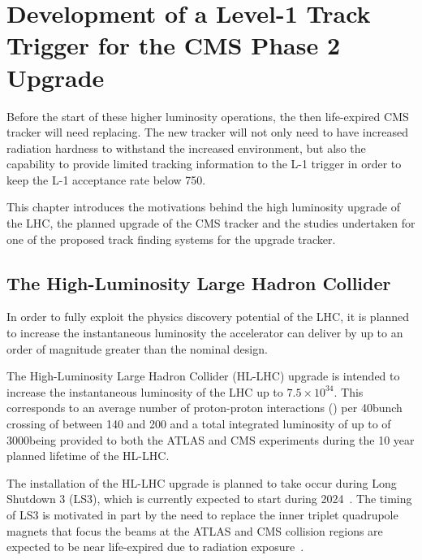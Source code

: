 \chapter{Development of a Level-1 Track Trigger for the CMS Phase 2 Upgrade}\label{chapter:tk-upgrade}
Before the start of these higher luminosity operations, the then life-expired CMS tracker will need replacing.
The new tracker will not only need to have increased radiation hardness to withstand the increased \PU environment, but also the capability to provide limited tracking information to the L-1 trigger in order to keep the L-1 acceptance rate below 750\kHz.

This chapter introduces the motivations behind the high luminosity upgrade of the LHC, the planned upgrade of the CMS tracker and the studies undertaken for one of the proposed track finding systems for the upgrade tracker.

\section{The High-Luminosity Large Hadron Collider} \label{sec:hl-lhc}
In order to fully exploit the physics discovery potential of the LHC, it is planned to increase the instantaneous luminosity the accelerator can deliver by up to an order of magnitude greater than the nominal design.

The High-Luminosity Large Hadron Collider (HL-LHC) upgrade is intended to increase the instantaneous luminosity of the LHC up  to $7.5 \times {10}^{34}$\percms.
This corresponds to an average number of proton-proton interactions (\PU) per 40\MHz bunch crossing of between 140 and 200 and a total integrated luminosity of up to of 3000\fbinv being provided to both the ATLAS and CMS experiments during the 10 year planned lifetime of the HL-LHC.

The installation of the HL-LHC upgrade is planned to take occur during Long Shutdown 3 (LS3), which is currently expected to start during 2024~\cite{ApollinariG.:2017ojx}. 
The timing of LS3 is motivated in part by the need to replace the inner triplet quadrupole magnets that focus the beams at the ATLAS and CMS collision regions are expected to be near life-expired due to radiation exposure~\cite{hl-lhc-prelim-design-report,CMS_Upgrade_TP}.

